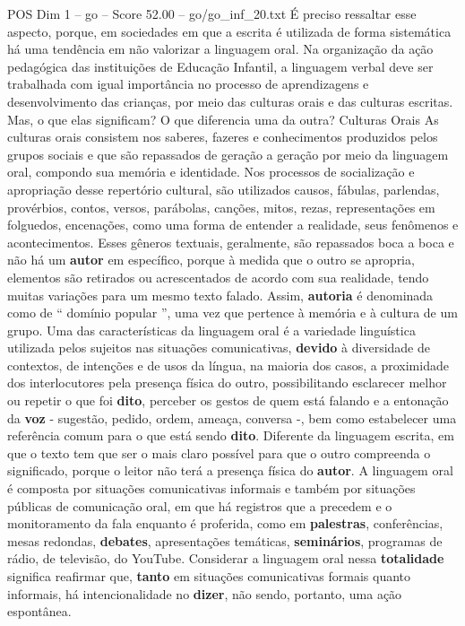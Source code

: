 \begin{textsample}{POS Dim 1 – go – Score 52.00 – go/go\_inf\_20.txt}
É preciso ressaltar esse aspecto, porque, em sociedades em que a escrita é utilizada de forma sistemática há uma tendência em não valorizar a linguagem oral.
Na organização da ação pedagógica das instituições de Educação Infantil, a linguagem verbal deve ser trabalhada com igual importância no processo de aprendizagens e desenvolvimento das crianças, por meio das culturas orais e das culturas escritas.
Mas, o que elas significam?
O que diferencia uma da outra?
Culturas Orais As culturas orais consistem nos saberes, fazeres e conhecimentos produzidos pelos grupos sociais e que são repassados de geração a geração por meio da linguagem oral, compondo sua memória e identidade.
Nos processos de socialização e apropriação desse repertório cultural, são utilizados causos, fábulas, parlendas, provérbios, contos, versos, parábolas, canções, mitos, rezas, representações em folguedos, encenações, como uma forma de entender a realidade, seus fenômenos e acontecimentos.
Esses gêneros textuais, geralmente, são repassados boca a boca e não há um \textbf{autor} em específico, porque à medida que o outro se apropria, elementos são retirados ou acrescentados de acordo com sua realidade, tendo muitas variações para um mesmo texto falado.
Assim, \textbf{autoria} é denominada como de “ domínio popular ”, uma vez que pertence à memória e à cultura de um grupo.
Uma das características da linguagem oral é a variedade linguística utilizada pelos sujeitos nas situações comunicativas, \textbf{devido} à diversidade de contextos, de intenções e de usos da língua, na maioria dos casos, a proximidade dos interlocutores pela presença física do outro, possibilitando esclarecer melhor ou repetir o que foi \textbf{dito}, perceber os gestos de quem está falando e a entonação da \textbf{voz} - sugestão, pedido, ordem, ameaça, conversa -, bem como estabelecer uma referência comum para o que está sendo \textbf{dito}.
Diferente da linguagem escrita, em que o texto tem que ser o mais claro possível para que o outro compreenda o significado, porque o leitor não terá a presença física do \textbf{autor}.
A linguagem oral é composta por situações comunicativas informais e também por situações públicas de comunicação oral, em que há registros que a precedem e o monitoramento da fala enquanto é proferida, como em \textbf{palestras}, conferências, mesas redondas, \textbf{debates}, apresentações temáticas, \textbf{seminários}, programas de rádio, de televisão, do YouTube.
Considerar a linguagem oral nessa \textbf{totalidade} significa reafirmar que, \textbf{tanto} em situações comunicativas formais quanto informais, há intencionalidade no \textbf{dizer}, não sendo, portanto, uma ação espontânea.

\end{textsample}
